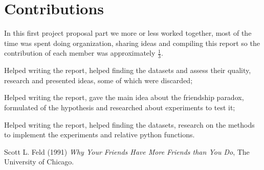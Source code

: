 \documentclass{article}
\begin{document}
\section*{Contributions}
In this first project proposal part we more or less worked together, most of the time was spent doing organization, sharing ideas and compiling this report so the contribution of each member was approximately $\frac{1}{3}$.
\begin{description}[font=\normalfont\itshape]
    \item[Lavorati Ippolito:] Helped writing the report, helped finding the datasets and assess their quality, research and presented ideas, some of which were discarded;
    \item[Orsolon Ludovico:] Helped writing the report, gave the main idea about the friendship paradox, formulated of the hypothesis and researched about experiments to test it;
    \item[Stefani Patrizia:] Helped writing the report, helped finding the datasets, research on the methods to implement the experiments and relative python functions.
\end{description}
\begin{thebibliography}{9}
Scott L. Feld (1991) \emph{Why Your Friends Have More Friends
than You Do}, The University of Chicago.
\end{thebibliography}
\end{document}
